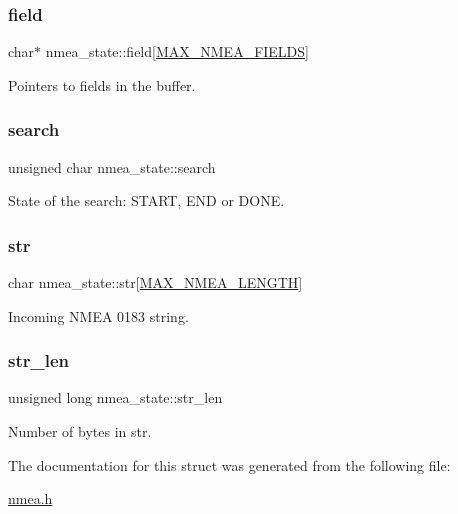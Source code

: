 \subsubsection{\texorpdfstring{field}{field}}
{\footnotesize\ttfamily char$\ast$ nmea\+\_\+state\+::field\mbox{[}\mbox{\hyperlink{nmea_8h_a3e71b1d0a33b70921fc460b33bbf068d}{M\+A\+X\+\_\+\+N\+M\+E\+A\+\_\+\+F\+I\+E\+L\+DS}}\mbox{]}}



Pointers to fields in the buffer. 

\mbox{\label{structnmea__state_af328f20b3659e91c66c79d832680dec6}} 
\subsubsection{\texorpdfstring{search}{search}}
{\footnotesize\ttfamily unsigned char nmea\+\_\+state\+::search}



State of the search\+: S\+T\+A\+RT, E\+ND or D\+O\+NE. 

\mbox{\label{structnmea__state_a6ec31934d18620490b027e544c574f6b}} 
\subsubsection{\texorpdfstring{str}{str}}
{\footnotesize\ttfamily char nmea\+\_\+state\+::str\mbox{[}\mbox{\hyperlink{nmea_8h_a1266d7c7847e5fce687eafaee2f46262}{M\+A\+X\+\_\+\+N\+M\+E\+A\+\_\+\+L\+E\+N\+G\+TH}}\mbox{]}}



Incoming N\+M\+EA 0183 string. 

\mbox{\label{structnmea__state_a7e40c5b90eb5a0c69d13a80878478904}} 
\subsubsection{\texorpdfstring{str\+\_\+len}{str\_len}}
{\footnotesize\ttfamily unsigned long nmea\+\_\+state\+::str\+\_\+len}



Number of bytes in str. 



The documentation for this struct was generated from the following file\+:\begin{DoxyCompactItemize}
\item 
\mbox{\hyperlink{nmea_8h}{nmea.\+h}}\end{DoxyCompactItemize}
